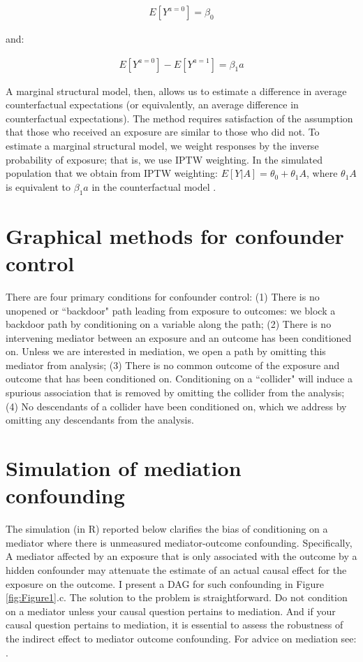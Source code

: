 \documentclass[]{interact}
\theoremstyle{plain}%
\theoremstyle{definition}
\theoremstyle{remark}
\begin{document}
$$
\begin{aligned}
E[Y^{a=0}] = \beta_0
\end{aligned}
$$

and: 

$$
\begin{aligned}
E[Y^{a=0}] - E[Y^{a=1}] = \beta_1a
\end{aligned}
$$

A marginal structural model, then, allows us to estimate a difference in average counterfactual expectations (or equivalently, an average difference in counterfactual expectations). The method requires satisfaction of the assumption that those who received an exposure are similar to those who did not. To estimate a marginal structural model, we weight responses by the inverse probability of exposure; that is, we use IPTW weighting. In the simulated population that we obtain from IPTW weighting: $E[Y|A] =\theta_0 + \theta_1A$, where $\theta_1A$ is equivalent to $\beta_1a$ in the counterfactual model \citep{hernan_causal_2020}. 

\newpage
\section{Graphical methods for confounder control}
\label{app:dags}
There are four primary conditions for confounder control:  (1) There is no unopened or “backdoor" path leading from exposure to outcomes: we block a backdoor path by conditioning on a variable along the path; (2) There is no intervening mediator between an exposure and an outcome has been conditioned on. Unless we are interested in mediation, we open a path by omitting this mediator from analysis; (3) There is no common outcome of the exposure and outcome that has been conditioned on. Conditioning on a “collider" will induce a spurious association that is removed by omitting the collider from the analysis; (4) No descendants of a collider have been conditioned on, which we address by omitting any descendants from the analysis.

\newpage
\section{Simulation of mediation confounding}
\label{app:simulation}


The simulation (in R) reported below clarifies the bias of conditioning on a mediator where there is unmeasured mediator-outcome confounding. Specifically, A mediator affected by an exposure that is only associated with the outcome by a hidden confounder may attenuate the estimate of an actual causal effect for the exposure on the outcome. I present a DAG for such confounding in Figure \ref{fig:Figure1}.c. The solution to the problem is straightforward. Do not condition on a mediator unless your causal question pertains to mediation. And if your causal question pertains to mediation, it is essential to assess the robustness of the indirect effect to mediator outcome confounding. For advice on mediation see: \citet{vanderweele_explanation_2015}.
\end{document}
